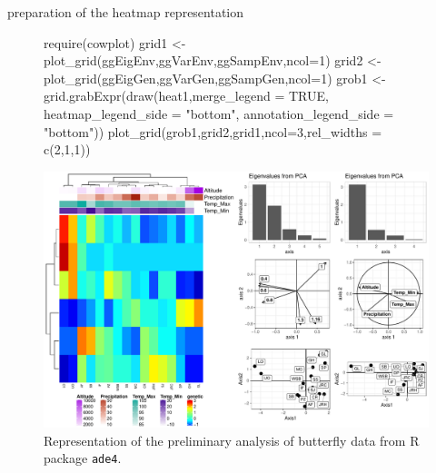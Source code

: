 \documentclass[a4paper,10pt]{article}
\begin{document}
preparation of the heatmap representation
\begin{Schunk}
\end{Schunk}


\begin{figure}[H]
\begin{center}
\begin{Schunk}
\begin{Sinput}
  require(cowplot)
  grid1 <- plot_grid(ggEigEnv,ggVarEnv,ggSampEnv,ncol=1)
  grid2 <- plot_grid(ggEigGen,ggVarGen,ggSampGen,ncol=1)
  grob1 <- grid.grabExpr(draw(heat1,merge_legend = TRUE, heatmap_legend_side = "bottom",
                             annotation_legend_side = "bottom"))
  plot_grid(grob1,grid2,grid1,ncol=3,rel_widths = c(2,1,1))
\end{Sinput}
\end{Schunk}
\includegraphics{figs/sweave-heat1}
\caption{Representation of the preliminary analysis of butterfly data from R package \texttt{ade4}.}
\label{fig:heat1}
\end{center}
\end{figure}
\end{document}
